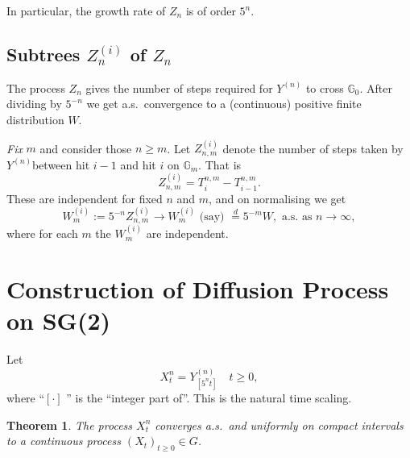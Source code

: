 \documentclass[a4paper]{amsart}
\theoremstyle{plain}
\newtheorem{theorem}{Theorem}[section]
\theoremstyle{definition}
\theoremstyle{remark}
\begin{document}
 In particular, the growth rate of $ Z_n $ is of order $ 5^n $.
 
\subsection{Subtrees $ Z_n^{(i)} $ of $Z_n $}   
The process $ Z_n $ gives the number of steps required for $ Y^{(n)} $   to cross $ \mathbb{G}_0 $.  After dividing by $ 5^{-n} $ we get a.s.\ convergence to a (continuous) positive finite distribution $ W $.

\emph{Fix} $ m $ and consider those $ n \geq m $. 
Let $   Z_{n,m}^{(i)} $ denote the number of steps taken by   $ Y^{(n)} $between hit $ i-1 $ and hit $ i  $ on $ \mathbb{G}_m $.   That is
\begin{equation} \label{eq1}
 Z_{n,m}^{(i)} =T^{n,m}_i - T^{n,m}_{i -1}. 
\end{equation} 
These are independent for fixed $ n $ and $ m $, and on normalising we get
\begin{equation} \label{eq2}
 W^{(i)}_m := 5^{-n}  Z_{n,m}^{(i)}  \to W_m^{(i)} \text{ (say) }    \overset{d }{=} 5^{-m} W,\text{ a.s.\ as } n\to \infty,
\end{equation} 
where for each $ m $ the $ W^{(i)}_m $ are independent.




\section{\textbf{Construction of Diffusion Process on SG(2)}}\label{seccp}
Let
\begin{equation} \label{}
X_t^n = Y^{(n)}_{[5^nt]} \quad t \geq 0,
\end{equation}
where ``$ [\cdot] $ '' is the ``integer part of''.  This is the natural time scaling.

\begin{theorem}
 The process $ X^n_t $ converges a.s.\ and uniformly on compact intervals to a continuous process $ (X_t)_{t\geq 0} \in G$.
\end{theorem}
\end{document}
